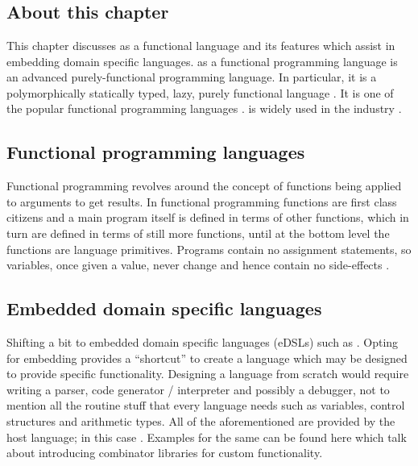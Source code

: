 \documentclass[thesis-solanki.tex]{subfiles}
\begin{document}
\chapter{}\label{chap:hwh}


\section{About this chapter}
This chapter discusses  as a functional language and its features which assist in embedding domain specific languages.
 as a functional programming language  is an advanced purely-functional programming
  language.
  In particular, it is a polymorphically statically typed, lazy, purely functional language
  \cite{website:haskellwiki}.
  It is one of the popular functional programming languages \cite{website:langpop}.
   is widely used in the industry \cite{website:haskellinindustry}.
  
\section{Functional programming languages}
Functional programming revolves around the concept of functions being applied to arguments to get results. In functional programming
functions are first class citizens and a main program itself is defined in terms of
other functions, which in turn are defined in terms of still more functions, until
at the bottom level the functions are language primitives. Programs contain no
assignment statements, so variables, once given a value, never change and hence contain no side-effects \cite{hughes1989functional}.


\section{Embedded domain specific languages}
  Shifting a bit to embedded domain specific languages (eDSLs) such as .
  Opting for embedding provides a ``shortcut'' to create a language which may be designed to provide specific
  functionality.
  Designing a language from scratch would require writing a parser, code generator / interpreter and possibly a
  debugger, not to mention all the routine stuff that every language
  needs such as variables, control structures and 
  arithmetic types.
  All of the aforementioned are provided by the host language; in this case .
  Examples for the same can be found here \cite{jones2001composing, meyer2008eiffel} which talk about introducing
  combinator libraries for custom functionality.
\end{document}
